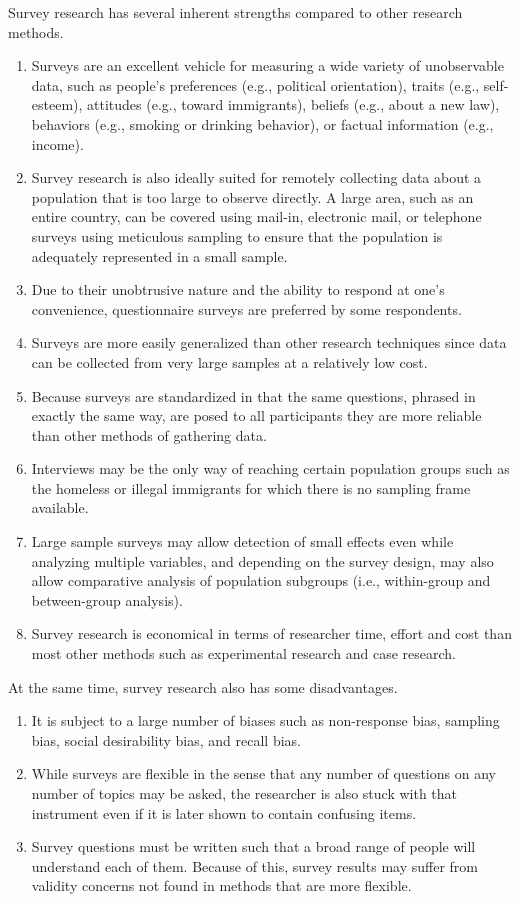 Survey research has several inherent strengths compared to other research methods. 

\begin{enumerate}
	\item Surveys are an excellent vehicle for measuring a wide variety of unobservable data, such as people's preferences (e.g., political orientation), traits (e.g., self-esteem), attitudes (e.g., toward immigrants), beliefs (e.g., about a new law), behaviors (e.g., smoking or drinking behavior), or factual information (e.g., income). 
	\item Survey research is also ideally suited for remotely collecting data about a population that is too large to observe directly. A large area, such as an entire country, can be covered using mail-in, electronic mail, or telephone surveys using meticulous sampling to ensure that the population is adequately represented in a small sample. 
	\item Due to their unobtrusive nature and the ability to respond at one's convenience, questionnaire surveys are preferred by some respondents.
	\item Surveys are more easily generalized than other research techniques since data can be collected from very large samples at a relatively low cost.
	\item Because surveys are standardized in that the same questions, phrased in exactly the same way, are posed to all participants they are more reliable than other methods of gathering data.
	\item Interviews may be the only way of reaching certain population groups such as the homeless or illegal immigrants for which there is no sampling frame available. 
	\item Large sample surveys may allow detection of small effects even while analyzing multiple variables, and depending on the survey design, may also allow comparative analysis of population subgroups (i.e., within-group and between-group analysis). 
	\item Survey research is economical in terms of researcher time, effort and cost than most other methods such as experimental research and case research.
\end{enumerate}

At the same time, survey research also has some disadvantages. 

\begin{enumerate}
	\item It is subject to a large number of biases such as non-response bias, sampling bias, social desirability bias, and recall bias.
	\item While surveys are flexible in the sense that any number of questions on any number of topics may be asked, the researcher is also stuck with that instrument even if it is later shown to contain confusing items. 
	\item Survey questions must be written such that a broad range of people will understand each of them. Because of this, survey results may suffer from validity concerns not found in methods that are more flexible. 
\end{enumerate}
 
